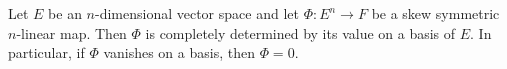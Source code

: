 Let $E$ be an $n$-dimensional vector space and let $\Phi: E^n \to F$ be a skew symmetric $n$-linear map. Then $\Phi$ is completely determined by its value on a basis of $E$. In particular, if $\Phi$ vanishes on a basis, then $\Phi = 0$.
